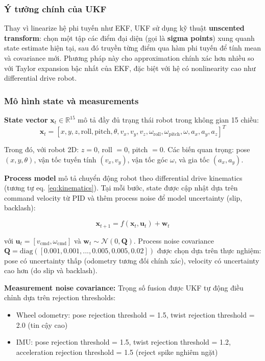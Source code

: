 \subsubsection{Ý tưởng chính của UKF}

Thay vì linearize hệ phi tuyến như EKF, UKF sử dụng kỹ thuật \textbf{unscented transform}: chọn một tập các điểm đại diện (gọi là \textbf{sigma points}) xung quanh state estimate hiện tại, sau đó truyền từng điểm qua hàm phi tuyến để tính mean và covariance mới. Phương pháp này cho approximation chính xác hơn nhiều so với Taylor expansion bậc nhất của EKF, đặc biệt với hệ có nonlinearity cao như differential drive robot.

\subsubsection{Mô hình state và measurements}

\textbf{State vector} $\mathbf{x}_t \in \mathbb{R}^{15}$ mô tả đầy đủ trạng thái robot trong không gian 15 chiều:
\begin{equation}
\mathbf{x}_t = [x, y, z, \text{roll}, \text{pitch}, \theta, v_x, v_y, v_z, \omega_{\text{roll}}, \omega_{\text{pitch}}, \omega, a_x, a_y, a_z]^T
\end{equation}

Trong đó, với robot 2D: $z = 0$, roll $= 0$, pitch $= 0$. Các biến quan trọng: pose $(x, y, \theta)$, vận tốc tuyến tính $(v_x, v_y)$, vận tốc góc $\omega$, và gia tốc $(a_x, a_y)$.

\textbf{Process model} mô tả chuyển động robot theo differential drive kinematics (tương tự eq. \ref{eq:kinematics}). Tại mỗi bước, state được cập nhật dựa trên command velocity từ PID và thêm process noise để model uncertainty (slip, backlash):

\begin{equation}
\mathbf{x}_{t+1} = f(\mathbf{x}_t, \mathbf{u}_t) + \mathbf{w}_t
\end{equation}

với $\mathbf{u}_t = [v_{\text{cmd}}, \omega_{\text{cmd}}]$ và $\mathbf{w}_t \sim \mathcal{N}(0, \mathbf{Q})$. Process noise covariance $\mathbf{Q} = \text{diag}([0.001, 0.001, ..., 0.005, 0.005, 0.02])$ được chọn dựa trên thực nghiệm: pose có uncertainty thấp (odometry tương đối chính xác), velocity có uncertainty cao hơn (do slip và backlash).

\textbf{Measurement noise covariance:} Trọng số fusion được UKF tự động điều chỉnh dựa trên rejection thresholds:
\begin{itemize}[nosep]
\item Wheel odometry: pose rejection threshold = 1.5, twist rejection threshold = 2.0 (tin cậy cao)
\item IMU: pose rejection threshold = 1.5, twist rejection threshold = 1.2, acceleration rejection threshold = 1.5 (reject spike nghiêm ngặt)
\end{itemize}

